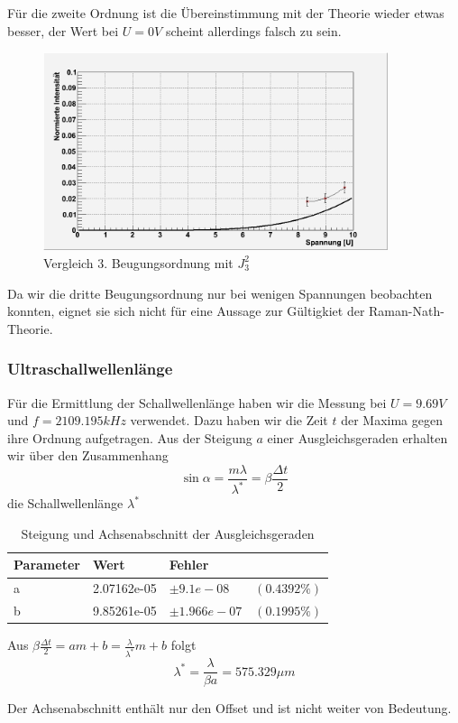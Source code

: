 Für die zweite Ordnung ist die Übereinstimmung mit der Theorie wieder etwas besser, der Wert bei $U=0V$ scheint allerdings falsch zu sein.
\begin{figure}[H]
 \includegraphics[width=0.9\textwidth]{Bilder/raman/raman-fit_3.png}
 \caption{Vergleich 3. Beugungsordnung mit $J_3^2$}
\end{figure}
Da wir die dritte Beugungsordnung nur bei wenigen Spannungen beobachten konnten, eignet sie sich nicht für eine Aussage zur Gültigkiet der Raman-Nath-Theorie.

\subsubsection{Ultraschallwellenlänge}

Für die Ermittlung der Schallwellenlänge haben wir die Messung bei $ U = 9.69 V$ und $f = 2109.195 kHz $ verwendet. Dazu haben wir die Zeit $t$ der Maxima gegen ihre Ordnung aufgetragen. Aus der Steigung $a$ einer Ausgleichsgeraden erhalten wir über den Zusammenhang 
$$ \sin \alpha = \frac{m \lambda}{\lambda^{*}} = \beta \frac{\Delta t}{2} $$
 die Schallwellenlänge $ \lambda^* $


\begin{table}[H]
\begin{center}
\caption{Steigung und Achsenabschnitt der Ausgleichsgeraden}
\begin{tabular}{llll}
\toprule
Parameter & Wert & Fehler & \\
\midrule
a & 2.07162e-05   &  $ \pm 9.1e-08$  &    $(0.4392\%)$\\
b & 9.85261e-05 & $ \pm 1.966e-07$ &   $(0.1995\%)$ \\
\bottomrule
\end{tabular}
\end{center}
\end{table}


Aus $ \beta \frac{\Delta t}{2} = a m + b = \frac{\lambda}{\lambda^*} m + b $ folgt 
$$\boxed{ \lambda^* = \frac{\lambda}{\beta a} = 575.329 \mu m}$$

Der Achsenabschnitt enthält nur den Offset und ist nicht weiter von Bedeutung. 

